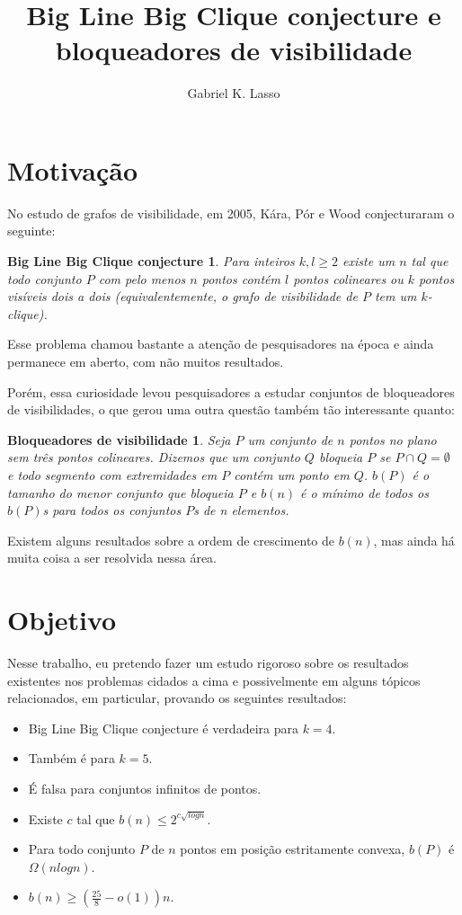 \documentclass[a4paper]{article}
\title{Big Line Big Clique conjecture e bloqueadores de visibilidade}
\author{Gabriel K. Lasso}
\date{}
\newtheorem*{bigline}{Big Line Big Clique conjecture}
\newtheorem*{bloqueadores}{Bloqueadores de visibilidade}
\begin{document}
\maketitle
\section{Motivação}
No estudo de grafos de visibilidade, em 2005, Kára, Pór e Wood\cite{visibilitygraph} conjecturaram o seguinte:
\begin{bigline}
Para inteiros $k, l\geq 2$ existe um $n$ tal que todo conjunto $P$ com pelo menos $n$ pontos contém $l$ pontos colineares ou $k$ pontos visíveis dois a dois (equivalentemente, o grafo de visibilidade de $P$ tem um $k$-clique).
\end{bigline}
Esse problema chamou bastante a atenção de pesquisadores na época\cite{pentagon, visblock, infinity} e ainda permanece em aberto, com não muitos resultados.

Porém, essa curiosidade levou pesquisadores a estudar conjuntos de bloqueadores de visibilidades, o que gerou uma outra questão também tão interessante quanto:
\begin{bloqueadores}
Seja $P$ um conjunto de $n$ pontos no plano sem três pontos colineares. Dizemos que um conjunto $Q$ bloqueia $P$ se $P\cap Q=\emptyset$ e todo segmento com extremidades em $P$ contém um ponto em $Q$. $b(P)$ é o tamanho do menor conjunto que bloqueia $P$ e $b(n)$ é o mínimo de todos os $b(P)$s para todos os conjuntos $P$s de n elementos.
\end{bloqueadores}
Existem alguns resultados sobre a ordem de crescimento de $b(n)$, mas ainda há muita coisa a ser resolvida nessa área.

\section{Objetivo}
Nesse trabalho, eu pretendo fazer um estudo rigoroso sobre os resultados existentes nos problemas cidados a cima e possivelmente em alguns tópicos relacionados, em particular, provando os seguintes resultados:
\begin{itemize}
\item
    Big Line Big Clique conjecture é verdadeira para $k=4$\cite{visibilitygraph}.
\item
    Também é para $k=5$\cite{pentagon}.
\item
    É falsa para conjuntos infinitos de pontos\cite{infinity}.
\item
    Existe $c$ tal que $b(n)\leq 2^{c\sqrt{logn}}$\cite{blockers}.
\item
    Para todo conjunto $P$ de $n$ pontos em posição estritamente convexa, $b(P)$ é $\Omega(nlogn)$\cite{blockers}.
\item
    $b(n)\geq(\frac{25}{8}-o(1))n$\cite{block}.
\end{itemize}


{}
\end{document}
